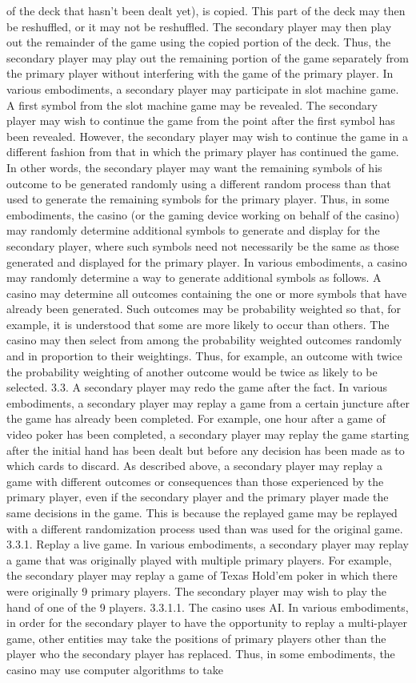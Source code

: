 \documentclass[11pt,a4paper]{article}
\begin{document}
of the deck that hasn't been dealt yet), is copied. This part of the deck may then be reshuffled, or it may not be reshuffled. The secondary player may then play out the remainder of the game using the copied portion of the deck. Thus, the secondary player may play out the remaining portion of the game separately from the primary player without interfering with the game of the primary player. In various embodiments, a secondary player may participate in slot machine game. A first symbol from the slot machine game may be revealed. The secondary player may wish to continue the game from the point after the first symbol has been revealed. However, the secondary player may wish to continue the game in a different fashion from that in which the primary player has continued the game. In other words, the secondary player may want the remaining symbols of his outcome to be generated randomly using a different random process than that used to generate the remaining symbols for the primary player. Thus, in some embodiments, the casino (or the gaming device working on behalf of the casino) may randomly determine additional symbols to generate and display for the secondary player, where such symbols need not necessarily be the same as those generated and displayed for the primary player. In various embodiments, a casino may randomly determine a way to generate additional symbols as follows. A casino may determine all outcomes containing the one or more symbols that have already been generated. Such outcomes may be probability weighted so that, for example, it is understood that some are more likely to occur than others. The casino may then select from among the probability weighted outcomes randomly and in proportion to their weightings. Thus, for example, an outcome with twice the probability weighting of another outcome would be twice as likely to be selected. 3.3. A secondary player may redo the game after the fact. In various embodiments, a secondary player may replay a game from a certain juncture after the game has already been completed. For example, one hour after a game of video poker has been completed, a secondary player may replay the game starting after the initial hand has been dealt but before any decision has been made as to which cards to discard. As described above, a secondary player may replay a game with different outcomes or consequences than those experienced by the primary player, even if the secondary player and the primary player made the same decisions in the game. This is because the replayed game may be replayed with a different randomization process used than was used for the original game. 3.3.1. Replay a live game. In various embodiments, a secondary player may replay a game that was originally played with multiple primary players. For example, the secondary player may replay a game of Texas Hold'em poker in which there were originally 9 primary players. The secondary player may wish to play the hand of one of the 9 players. 3.3.1.1. The casino uses AI. In various embodiments, in order for the secondary player to have the opportunity to replay a multi-player game, other entities may take the positions of primary players other than the player who the secondary player has replaced. Thus, in some embodiments, the casino may use computer algorithms to take 
\end{document}
